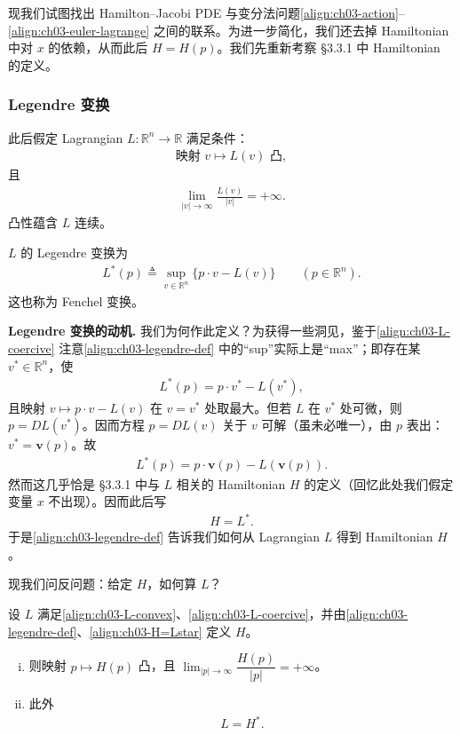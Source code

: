 \documentclass[../../main.tex]{subfiles}
\begin{document}
现我们试图找出 Hamilton--Jacobi PDE 与变分法问题\eqref{align:ch03-action}--\eqref{align:ch03-euler-lagrange} 之间的联系。为进一步简化，我们还去掉 Hamiltonian 中对 $x$ 的依赖，从而此后 $H=H(p)$。我们先重新考察 \S3.3.1 中 Hamiltonian 的定义。

\subsubsection{Legendre 变换}

此后假定 Lagrangian $L:\mathbb{R}^n\to\mathbb{R}$ 满足条件：
\begin{align}\label{align:ch03-L-convex}
\text{映射 }v\mapsto L(v)\text{ 凸},
\end{align}
且
\begin{align}\label{align:ch03-L-coercive}
\lim_{|v|\to\infty}\frac{L(v)}{|v|}=+\infty.
\end{align}
凸性蕴含 $L$ 连续。

\begin{definition}\label{definition:ch03-legendre}
$L$ 的 Legendre 变换为
\begin{align}\label{align:ch03-legendre-def}
L^*(p)\triangleq\sup_{v\in\mathbb{R}^n}\{p\cdot v-L(v)\} \qquad (p\in\mathbb{R}^n).
\end{align}
这也称为 Fenchel 变换。
\end{definition}

\textbf{Legendre 变换的动机.} 我们为何作此定义？为获得一些洞见，鉴于\eqref{align:ch03-L-coercive} 注意\eqref{align:ch03-legendre-def} 中的``sup''实际上是``max''；即存在某 $v^*\in\mathbb{R}^n$，使
\begin{align*}
L^*(p)=p\cdot v^*-L(v^*),
\end{align*}
且映射 $v\mapsto p\cdot v-L(v)$ 在 $v=v^*$ 处取最大。但若 $L$ 在 $v^*$ 处可微，则 $p=DL(v^*)$。因而方程 $p=DL(v)$ 关于 $v$ 可解（虽未必唯一），由 $p$ 表出：$v^*=\mathbf{v}(p)$。故
\begin{align*}
L^*(p)=p\cdot\mathbf{v}(p)-L(\mathbf{v}(p)).
\end{align*}
然而这几乎恰是 \S3.3.1 中与 $L$ 相关的 Hamiltonian $H$ 的定义（回忆此处我们假定变量 $x$ 不出现）。因而此后写
\begin{align}\label{align:ch03-H=Lstar}
H=L^*.
\end{align}
于是\eqref{align:ch03-legendre-def} 告诉我们如何从 Lagrangian $L$ 得到 Hamiltonian $H$。

现我们问反问题：给定 $H$，如何算 $L$？

\begin{theorem}\label{theorem:ch03-convex-dual}设 $L$ 满足\eqref{align:ch03-L-convex}、\eqref{align:ch03-L-coercive}，并由\eqref{align:ch03-legendre-def}、\eqref{align:ch03-H=Lstar} 定义 $H$。
\begin{enumerate}[(i)]
\item 则映射 $p\mapsto H(p)$ 凸，且 $\lim_{|p|\to\infty}\dfrac{H(p)}{|p|}=+\infty$。
\item 此外
\begin{align}\label{align:ch03-L=Hstar}
L=H^*.
\end{align}
\end{enumerate}
\end{theorem}
\end{document}
